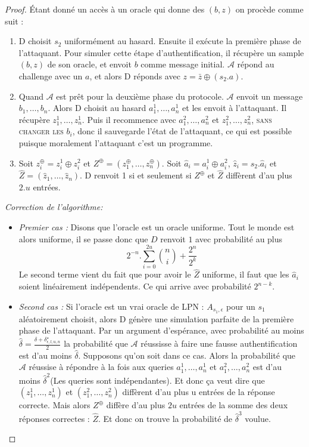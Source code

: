 \documentclass{article}		%
\theoremstyle{definition}
\theoremstyle{plain}
\theoremstyle{plain}
\theoremstyle{plain}
\theoremstyle{plain}
\theoremstyle{plain}
\begin{document}
\begin{proof}
Étant donné un accès à un oracle qui donne des $(b,z)$ on procède comme
suit :
\begin{enumerate}
\item D choisit $s_2$ uniformément au hasard. Ensuite il exécute la
première phase de l'attaquant. Pour simuler cette étape d'authentification,
il récupère un sample $(b,z)$ de son oracle, et envoit $b$ comme message
initial. $\mathcal{A}$ répond au challenge avec un $a$, et alors D
réponds avec $z=\bar{z}\oplus (s_2.a)$. 
\item Quand $\mathcal{A}$ est prêt pour la deuxième phase du protocole.
$\mathcal{A}$ envoit un message $b_1,\dots,b_n$. Alors D choisit au
hasard $a_1^1,\dots,a_n^1$ et les envoit à l'attaquant. Il récupère
$z_1^1,\dots,z_n^1$. Puis il recommence avec $a_1^2,\dots,a_n^2$ et
$z_1^2,\dots,z_n^2$, \textsc{sans changer les $b_i$}, donc il sauvegarde
l'état de l'attaquant, ce qui est possible puisque moralement l'attaquant
c'est un programme.
\item Soit $z_i^{\oplus}=z_i^1\oplus z_i^2$ et
$Z^{\oplus}=(z_1^{\oplus},\dots,z_n^{\oplus})$. Soit
$\hat{a}_i=a_i^1 \oplus a_i^2$, $\hat{z}_i=s_2.\hat{a}_i$
et $\hat{Z}=(\hat{z}_1,\dots, \hat{z}_n)$. D renvoit 1 si et seulement si
$Z^{\oplus}$ et $\hat{Z}$ diffèrent d'au plus $2.u$ entrées.
\end{enumerate}

\emph{Correction de l'algorithme:}\\
\begin{itemize}
\item \emph{Premier cas :} Disons que l'oracle est un oracle uniforme.
Tout le monde est alors uniforme, il se passe donc que $D$ renvoit $1$
avec probabilité au plus $$2^{-n}.\sum_{i=0}^{2u}\binom{n}{i} +
\frac{2^n}{2^k} $$
Le second terme vient du fait que pour avoir le $\hat{Z}$ uniforme, il
faut que les $\hat{a}_i$ soient linéairement indépendents. Ce qui arrive
avec probabilité $2^{n-k}$.
\item \emph{Second cas :} Si l'oracle est un vrai oracle de LPN :
$A_{s_1,\epsilon}$ pour un $s_1$ aléatoirement choisit, alors D génère
une simulation parfaite de la première phase de l'attaquant. Par un
argument d'espérance, avec
probabilité au moins
$\hat{\delta}=\frac{\delta+\delta^{\star}_{\epsilon,l,u,n}}{2}$ la
probabilité que $\mathcal{A}$ réussisse à faire une fausse
authentification est d'au moins $\hat{\delta}$. Supposons qu'on soit dans
ce cas. Alors la probabilité que $\mathcal{A}$ réussise à répondre à la
fois aux queries $a_1^1,\dots,a_n^1$ et $a_1^2,\dots,a_n^2$ est d'au
moins $\hat{\delta}^2$(Les queries sont indépendantes). Et donc ça veut
dire que $(z_1^1,\dots,z_n^1)$ et $(z_1^2,\dots,z_n^2)$  diffèrent d'au plus u entrées de la réponse
correcte.
Mais alors $Z^{\oplus}$ diffère d'au plus $2u$ entrées de la somme des
deux réponses correctes : $\hat{Z}$. Et donc on trouve la probabilité de
$\hat{\delta}^3$ voulue.
\end{itemize}
\end{proof}
\end{document}
